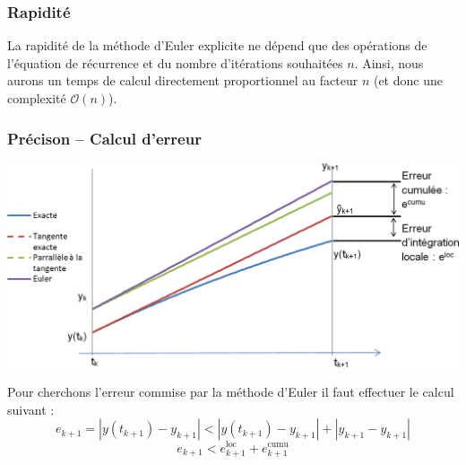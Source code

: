 \documentclass[10pt]{article}
\begin{document}
\subsubsection{Rapidité}
La rapidité de la méthode d’Euler explicite ne dépend que des opérations de l’équation de récurrence et du nombre d’itérations souhaitées $n$. Ainsi, nous aurons un temps de calcul directement proportionnel au facteur $n$ (et donc une complexité $\mathcal{O}(n)$).
\subsubsection{Précison -- Calcul d'erreur}

\begin{center}
\includegraphics[width=.8\textwidth]{images/fig_06}
\end{center}

Pour cherchons l’erreur commise par la méthode d’Euler il faut effectuer le calcul suivant :
$$e_{k+1}=|y(t_{k+1} )-y_{k+1} |<|y(t_{k+1} )-{y}_{k+1} |+|{y}_{k+1}-y_{k+1} |$$
$$e_{k+1}<e_{k+1}^{\text{loc}}+e_{k+1}^{\text{cumu}}$$
\end{document}
